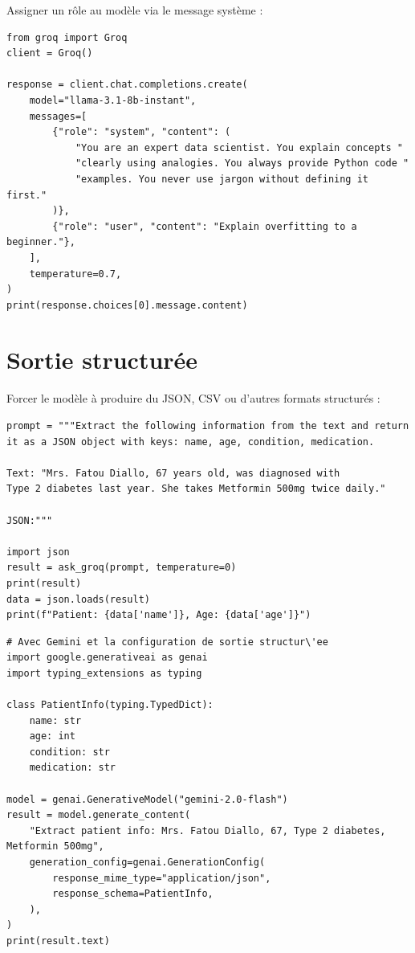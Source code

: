 Assigner un r\^ole au mod\`ele via le message syst\`eme :

\begin{verbatim}
from groq import Groq
client = Groq()

response = client.chat.completions.create(
    model="llama-3.1-8b-instant",
    messages=[
        {"role": "system", "content": (
            "You are an expert data scientist. You explain concepts "
            "clearly using analogies. You always provide Python code "
            "examples. You never use jargon without defining it first."
        )},
        {"role": "user", "content": "Explain overfitting to a beginner."},
    ],
    temperature=0.7,
)
print(response.choices[0].message.content)
\end{verbatim}

\section{Sortie structur\'ee}

Forcer le mod\`ele \`a produire du JSON, CSV ou d'autres formats structur\'es :

\begin{verbatim}
prompt = """Extract the following information from the text and return
it as a JSON object with keys: name, age, condition, medication.

Text: "Mrs. Fatou Diallo, 67 years old, was diagnosed with
Type 2 diabetes last year. She takes Metformin 500mg twice daily."

JSON:"""

import json
result = ask_groq(prompt, temperature=0)
print(result)
data = json.loads(result)
print(f"Patient: {data['name']}, Age: {data['age']}")
\end{verbatim}

\begin{verbatim}
# Avec Gemini et la configuration de sortie structur\'ee
import google.generativeai as genai
import typing_extensions as typing

class PatientInfo(typing.TypedDict):
    name: str
    age: int
    condition: str
    medication: str

model = genai.GenerativeModel("gemini-2.0-flash")
result = model.generate_content(
    "Extract patient info: Mrs. Fatou Diallo, 67, Type 2 diabetes, Metformin 500mg",
    generation_config=genai.GenerationConfig(
        response_mime_type="application/json",
        response_schema=PatientInfo,
    ),
)
print(result.text)
\end{verbatim}

